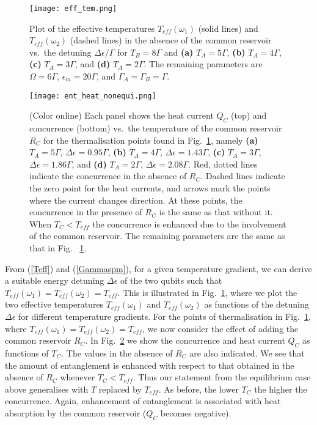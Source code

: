 \documentclass[12pt]{iopart}
\begin{document}
\begin{figure}[tbp]
\begin{center}
{\texttt{[image: eff\_tem.png]} }
\end{center}
\caption{Plot of the effective temperatures $T_{eff} (\omega_1)$ (solid lines) and $T_{eff} (\omega_2)$ (dashed lines) in the absence of the common reservoir vs.~the detuning $\Delta\epsilon/\Gamma$ for $T_{B}=8\Gamma$  and \textbf{(a)} $T_{A}=5\Gamma$, \textbf{(b)} $T_{A}=4\Gamma$, \textbf{(c)} $T_{A}=3\Gamma$, and \textbf{(d)} $T_{A}=2\Gamma$. The remaining parameters are $\Omega=6\Gamma$, $\epsilon_{m}=20\Gamma$, and $\Gamma_{A}=\Gamma_{B}=\Gamma$.}
\label{eff-tem}
\end{figure}


\begin{figure}[tbp]
\begin{center}
{\texttt{[image: ent\_heat\_nonequi.png]}
}
\end{center}
\caption{(Color online) Each panel shows the heat current $Q_C$ (top) and concurrence (bottom) vs.~the temperature of the common reservoir $R_C$ for the thermalisation points found in Fig.~\ref{eff-tem}, namely \textbf{(a)} $T_{A}=5\Gamma$, $\Delta\epsilon=0.95\Gamma$, \textbf{(b)} $T_{A}=4\Gamma$, $\Delta\epsilon=1.43\Gamma$, \textbf{(c)} $T_{A}=3\Gamma$, $\Delta\epsilon=1.86\Gamma$, and \textbf{(d)} $T_{A}=2\Gamma$, $\Delta\epsilon=2.08\Gamma$. Red, dotted lines indicate the concurrence in the absence of $R_C$. Dashed lines indicate the zero point for the heat currents, and arrows mark the points where the current changes direction. At these points, the concurrence in the presence of $R_C$ is the same as that without it. When $T_{C}<T_{eff}$ the concurrence is enhanced due to the involvement of the common reservoir. The remaining parameters are the same as that in Fig. ~\ref{eff-tem}. }
\label{ent-heat-nonequi}
\end{figure}

From (\ref{Teff}) and (\ref{Gammaspm}), for a given temperature gradient, we can derive a suitable energy detuning $\Delta\epsilon$ of the two qubits such that $T_{eff}(\omega_{1})=T_{eff}(\omega_{2})=T_{eff}$. This is illustrated in Fig.~\ref{eff-tem}, where we plot the two effective temperatures $T_{eff}(\omega_{1})$ and $T_{eff}(\omega_{2})$ as functions of the detuning $\Delta\epsilon$ for different temperature gradients. For the points of thermalisation in Fig.~\ref{eff-tem}, where $T_{eff}(\omega_{1})=T_{eff}(\omega_{2})=T_{eff}$, we now consider the effect of adding the common reservoir $R_C$. In Fig.~\ref{ent-heat-nonequi} we show the concurrence and heat current $Q_{C}$ as functions of $T_{C}$. The values in the absence of $R_C$ are also indicated. We see that the amount of entanglement is enhanced with respect to that obtained in the absence of $R_C$ whenever $T_{C}<T_{eff}$. Thus our statement from the equilibrium case above generalises with $T$ replaced by $T_{eff}$. As before, the lower $T_C$ the higher the concurrence. Again, enhancement of entanglement is associated with heat absorption by the common reservoir ($Q_{C}$ becomes negative).
\end{document}
